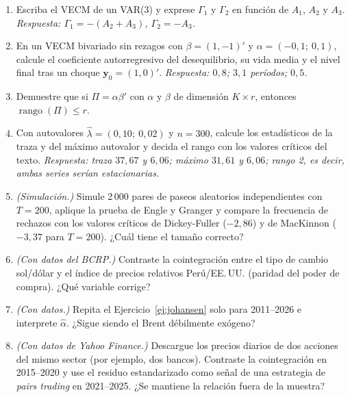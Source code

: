 \begin{enumerate}[label=\textbf{\thechapter.\arabic*},leftmargin=*,itemsep=6pt]
  \item Escriba el VECM de un VAR(3) y exprese $\Gamma_1$ y $\Gamma_2$ en función de $A_1$, $A_2$ y $A_3$.
  \textit{Respuesta: $\Gamma_1=-(A_2+A_3)$, $\Gamma_2=-A_3$.}

  \item En un VECM bivariado sin rezagos con $\beta=(1,-1)'$ y $\alpha=(-0{,}1;\ 0{,}1)$, calcule el coeficiente
  autorregresivo del desequilibrio, su vida media y el nivel final tras un choque $\mathbf y_0=(1,0)'$.
  \textit{Respuesta: $0{,}8$; $3{,}1$ períodos; $0{,}5$.}

  \item Demuestre que si $\Pi=\alpha\beta'$ con $\alpha$ y $\beta$ de dimensión $K\times r$, entonces
  $\operatorname{rango}(\Pi)\le r$.

  \item Con autovalores $\hat\lambda=(0{,}10;\ 0{,}02)$ y $n=300$, calcule los estadísticos de la traza y del máximo
  autovalor y decida el rango con los valores críticos del texto. \textit{Respuesta: traza $37{,}67$ y $6{,}06$;
  máximo $31{,}61$ y $6{,}06$; rango 2, es decir, ambas series serían estacionarias.}

  \item \emph{(Simulación.)} Simule 2\,000 pares de paseos aleatorios independientes con $T=200$, aplique la prueba
  de Engle y Granger y compare la frecuencia de rechazos con los valores críticos de Dickey-Fuller ($-2{,}86$) y de
  MacKinnon ($-3{,}37$ para $T=200$). ¿Cuál tiene el tamaño correcto?

  \item \emph{(Con datos del BCRP.)} Contraste la cointegración entre el tipo de cambio sol/dólar y el índice de
  precios relativos Perú/EE.\,UU. (paridad del poder de compra). ¿Qué variable corrige?

  \item \emph{(Con datos.)} Repita el Ejercicio~\ref{ej:johansen} solo para 2011--2026 e interprete $\hat\alpha$.
  ¿Sigue siendo el Brent débilmente exógeno?

  \item \emph{(Con datos de Yahoo Finance.)} Descargue los precios diarios de dos acciones del mismo sector (por
  ejemplo, dos bancos). Contraste la cointegración en 2015--2020 y use el residuo estandarizado como señal de una
  estrategia de \emph{pairs trading} en 2021--2025. ¿Se mantiene la relación fuera de la muestra?
\end{enumerate}

